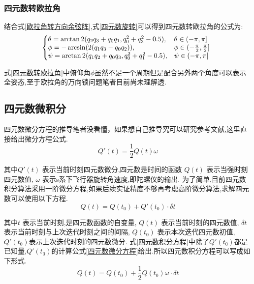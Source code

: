 \subsubsection{四元数转欧拉角}
结合式\ref{欧拉角转方向余弦阵},式\ref{四元数旋转}可以得到四元数转欧拉角的公式为:
\begin{equation}\label{四元数转欧拉角}
    \left\{\!\!\!\begin{array}{ll}
        \theta = \arctan2(q_2q_3+q_0q_1,q_0^2+q_3^2-0.5), & \theta \in (-\pi, \pi]\\
        \phi   =-\arcsin(2(q_1q_3-q_0q_2)), & \phi \in (-\frac{\pi}{2}, \frac{\pi}{2}] \\
        \psi   = \arctan2(q_1q_2+q_0q_3,q_0^2+q_1^2-0.5), & \psi \in (-\pi, \pi]
    \end{array}\right.
\end{equation}

式\ref{四元数转欧拉角}中俯仰角$\phi$虽然不足一个周期但是配合另外两个角度可以表示全姿态,至于欧拉角的万向锁问题笔者目前尚未理解透.

\subsection{四元数微积分}
四元数微分方程的推导笔者没看懂，如果想自己推导究可以研究参考文献\citet{四元数微分方程的推导},这里直接给出微分方程公式.
\begin{equation}\label{四元数微分方程}
    Q'(t) = \frac{1}{2}Q(t)\omega
\end{equation} 

其中$Q'(t)$ 表示当前时刻四元数微分,四元数是时间的函数
$Q(t)$      表示当强时刻四元数值,
$\omega$    表示s系下飞行器旋转角速度,即陀螺仪的输出.
为了简单,目前四元数积分算法采用一阶微分方程,如果后续实证精度不够再考虑高阶微分算法,求解四元数可以使用以下方程.
\begin{equation}\label{四元数积分方程}
    Q(t) = Q(t_0) + Q'(t_0) \cdot \delta t
\end{equation} 

其中$t$         表示当前时刻,是四元数函数的自变量,
$Q(t)$          表示当前时刻的四元数值,
$\delta t$      表示当前时刻与上次迭代时刻之间的间隔,
$Q(t_0)$ 表示本次迭代四元数初值,
$Q'(t_0)$表示上次迭代时刻的四元数微分.
式\ref{四元数积分方程}中除了$Q'(t_0)$都是已知量,$Q'(t_0)$的计算公式\ref{四元数微分方程}给出.所以四元数积分方程可以写成如下形式.
\begin{equation}\label{四元数递推方程}
    Q(t) = Q(t_0) + \frac{1}{2}Q(t_0)\omega \cdot \delta t
\end{equation} 


